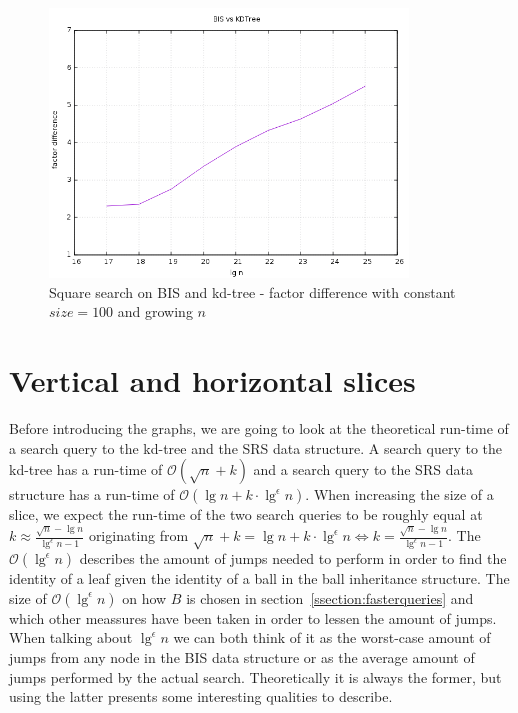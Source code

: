 \begin{figure}[h]
    \centering
    \includegraphics[width = 0.85\textwidth]{pictures/analysis/factor_difference_sqrtn_100.png}
    \caption{Square search on BIS and kd-tree - factor difference with constant $size = 100$ and growing $n$}\label{fig:factdiffsqrt100}
\end{figure}

\clearpage


\section{Vertical and horizontal slices}

Before introducing the graphs, we are going to look at the theoretical run-time of a search query to the kd-tree and the SRS data structure. A search query to the kd-tree has a run-time of $\mathcal{O}(\sqrt{n}+k)$ and a search query to the SRS data structure has a run-time of $\mathcal{O}(\lg n + k \cdot \lg^\epsilon n)$. When increasing the size of a slice, we expect the run-time of the two search queries to be roughly equal at $k \approx \frac{\sqrt{n} - \lg n}{\lg^\epsilon n - 1}$ originating from $\sqrt{n} + k = \lg n + k \cdot \lg^\epsilon n \Leftrightarrow k = \frac{\sqrt{n} - \lg n}{\lg^\epsilon n - 1}$. The $\mathcal{O}(\lg^\epsilon n)$ describes the amount of jumps needed to perform in order to find the identity of a leaf given the identity of a ball in the ball inheritance structure. The size of $\mathcal{O}(\lg^\epsilon n)$ on how $B$ is chosen in section~\ref{ssection:fasterqueries} and which other meassures have been taken in order to lessen the amount of jumps. When talking about $\lg^\epsilon n$ we can both think of it as the worst-case amount of jumps from any node in the BIS data structure or as the average amount of jumps performed by the actual search. Theoretically it is always the former, but using the latter presents some interesting qualities to describe.

